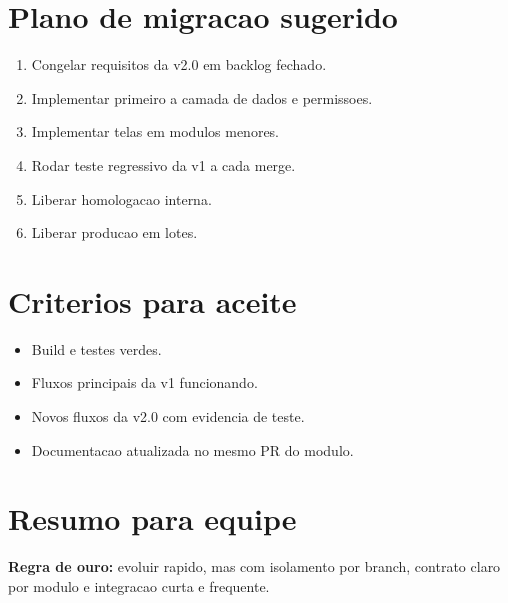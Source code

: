 \documentclass[12pt,a4paper]{article}
\begin{document}
\section{Plano de migracao sugerido}
\begin{enumerate}
\item Congelar requisitos da v2.0 em backlog fechado.
\item Implementar primeiro a camada de dados e permissoes.
\item Implementar telas em modulos menores.
\item Rodar teste regressivo da v1 a cada merge.
\item Liberar homologacao interna.
\item Liberar producao em lotes.
\end{enumerate}

\section{Criterios para aceite}
\begin{itemize}[leftmargin=*]
\item Build e testes verdes.
\item Fluxos principais da v1 funcionando.
\item Novos fluxos da v2.0 com evidencia de teste.
\item Documentacao atualizada no mesmo PR do modulo.
\end{itemize}

\section{Resumo para equipe}
\textbf{Regra de ouro:} evoluir rapido, mas com isolamento por branch, contrato claro por modulo e integracao curta e frequente.
\end{document}

